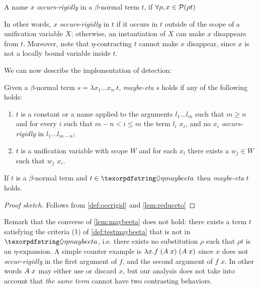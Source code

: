 \documentclass[sigconf,natbib=false,review]{acmart}
\newcommand{\appsep}{\ensuremath{\textcolor{lightgray}{\cdot}}}
\newcommand{\llambda}{\ensuremath{\mathcal{L}}\xspace}
\begin{document}

\newcommand{\occursrigid}{\emph{occurs-rigidly}\xspace}
\newcommand{\occurrigid}{\emph{occur-rigidly}\xspace}
\begin{definition}[\occursrigid]\label{def:occrigid}
  A name $x$ \occursrigid{} in a $\beta$-normal term $t$, if $\forall \rho, x \in
  \mathcal{P}(\rho t)$
\end{definition}

In other words, $x$ \occursrigid in $t$ if it occurs in $t$
outside of the scope of a unification variable $X$; otherwise, an instantiation
of $X$ can make $x$ disappears from $t$.
Moreover, note that $\eta$-contracting $t$ cannot make $x$ disappear, since
$x$ is not a locally bound variable inside $t$.

We can now describe the implementation of \maybeeta detection:

\newcommand{\testmaybeeta}{\emph{maybe-eta}\xspace}
\begin{definition}[\testmaybeeta]\label{def:testmaybeeta}
  Given a $\beta$-normal term
  $s = \lambda x_1 \ldots x_n.t$, \testmaybeeta{} $s$ holds if any
  of the following holds:
  \begin{enumerate}
    \item $t$ is a constant or a name applied to the arguments
      $l_1 \ldots l_m$ such that 
      $m \geq n$ and for every $i$ such that $m - n < i \leq m$
      the term  $l_i$
      \reduceto{} $x_i$, and
      no $x_i$ \occursrigid{} in $l_1 \ldots l_{m-n}$;
    \item $t$ is a
      unification variable with scope $W$ and
      for each $x_i$ there exists a $w_j \in W$ such that $w_j$
      \reduceto{} $x_i$.
  \end{enumerate}
\end{definition}
\begin{lemma}\label{lem:maybeeta}
  If $t$ is a $\beta$-normal term
  and
  $t \in \maybeeta$ then \testmaybeeta{} $t$ holds.
\end{lemma}
\begin{proof}[Proof sketch]
Follows from \cref{def:occrigid} and \cref{lem:reduceto}
\end{proof}

\noindent
Remark that the converse of \cref{lem:maybeeta} does not hold: 
there exists a term $t$ satisfying the criteria (1) of
\cref{def:testmaybeeta} that is not in $\maybeeta$, i.e.
there exists no substitution $\rho$ such that $\rho t$ is an
$\eta$-expansion. A simple counter example is
$\lambda x. f \appsep (A \appsep x) \appsep (A \appsep x)$
since $x$ does not \occurrigid{} in the first argument
of $f$,
and the second argument of $f$ \reduceto{} $x$.
In other words $A \appsep x$
may either use or discard $x$, but our analysis does not
take into account that \emph{the same
term} cannot have two contrasting behaviors.
\end{document}

